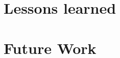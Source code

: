 

\label{sec:5}

\section{Lessons learned}
\label{sec:lessons-learned}

\section{Future Work}
\label{sec:future-work}
